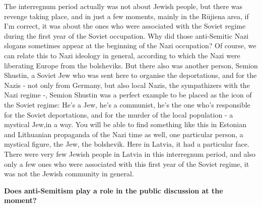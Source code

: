 The interregnum period actually was not about Jewish people, but there was revenge taking place, and in just a few moments, mainly in the Rūjiena area, if I'm correct, it was about the ones who were associated with the Soviet regime during the first year of the Soviet occupation. Why did those anti-Semitic Nazi slogans sometimes appear at the beginning of the Nazi occupation? Of course, we can relate this to Nazi ideology in general, according to which the Nazi were liberating Europe from the bolsheviks. But there also was another person, Semion Shustin, a Soviet Jew who was sent here to organise the  deportations, and for the Nazis - not only from Germany, but also local Nazis, the sympathizers with the Nazi regime -, Semion Shustin was a perfect example to be placed as the icon of the Soviet regime: He's a Jew, he's a communist, he's the one who's responsible for the Soviet deportations, and for the murder of the local population - a mystical Jew,in a way. You will be able to find something like this in Estonian and Lithuanian propaganda of the Nazi time as well, one particular person, a mystical figure, the Jew, the bolshevik. Here in Latvia, it had a particular face. There were very few Jewish people in Latvia in this interregnum period, and also only a few ones who were associated with this first year of the Soviet regime, it was not the Jewish community in general.
	
\textbf{Does anti-Semitism play a role in the public discussion at the moment?}

